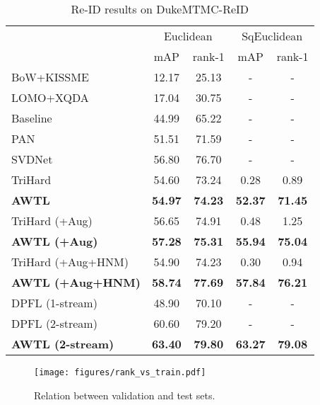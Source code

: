 \documentclass[10pt,twocolumn,letterpaper]{article}
\begin{document}
\begin{table}[t]
	\footnotesize
	\begin{center}
		\begin{tabular}{ |l | c  c | c  c|}
			\hline
			& \multicolumn{2}{c|}{Euclidean}  & \multicolumn{2}{c|}{SqEuclidean}    \\ 
			& mAP & rank-1 & mAP & rank-1   \\ \hline
			BoW+KISSME~\cite{zheng2015scalable}  &  12.17 & 25.13 & - & -  \\ 
			LOMO+XQDA~\cite{liao2015person} & 17.04 & 30.75 & - & -\\ 
			Baseline~\cite{zheng2016person} 	& 44.99 & 65.22 & - & -\\ 
			PAN~\cite{zheng2017pedestrian}       & 	51.51 & 71.59  & - & -\\ 
			SVDNet~\cite{SunZDW17} & 56.80 & 76.70 & - & -\\ \hline
			TriHard~\cite{hermans2017defense}  & 54.60 & 73.24 & 0.28 & 0.89   \\ 
   \textbf{AWTL}  & \textbf{54.97} & \textbf{74.23} & \textbf{52.37} & \textbf{71.45}  \\ \hline
   
   TriHard  (+Aug) & 56.65 & 74.91 & 0.48 & 1.25  \\ 
   \textbf{AWTL (+Aug)} & \textbf{57.28} & \textbf{75.31} & \textbf{55.94} & \textbf{75.04}  \\ \hline
			
	   TriHard (+Aug+HNM) & 54.90 & 74.23 & 0.30 & 0.94 \\ 
   \textbf{AWTL (+Aug+HNM)} & \textbf{58.74} & \textbf{77.69} & \textbf{57.84} & \textbf{76.21}  \\ \hline
   DPFL (1-stream)~\cite{chen2017person} & 48.90 & 70.10 & - & -  \\ 
      DPFL (2-stream)~\cite{chen2017person} & 60.60 & 79.20 & - & -  \\ 
  \textbf{AWTL (2-stream)} & \textbf{63.40} & \textbf{79.80} & \textbf{63.27} & \textbf{79.08} \\ \hline
   

			
		\end{tabular}
	\end{center}
	\caption{Re-ID results on DukeMTMC-ReID}
	\label{tab:dukemtmcreid}
\end{table}


\begin{figure}[t]
	\centering
\texttt{[image: figures/rank\_vs\_train.pdf]}
	\caption{Relation between validation and test sets.}
	\label{fig:rank_vs_train}
\end{figure}
\end{document}
